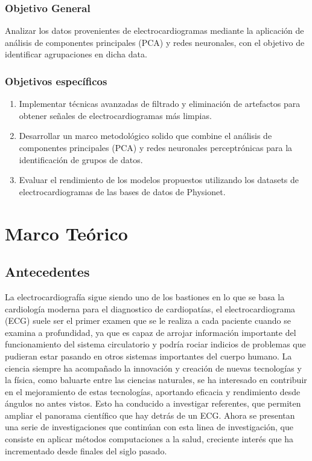 \documentclass[12pt,letterpaper,oneside,openright]{book}
\begin{document}
	\subsection{Objetivo General}
		Analizar los datos provenientes de electrocardiogramas mediante la aplicación de análisis de componentes principales (PCA) y redes neuronales, con el objetivo de identificar agrupaciones en dicha data.
	\subsection{Objetivos específicos}
\begin{enumerate}
	\item Implementar técnicas avanzadas de filtrado y eliminación de artefactos para obtener señales de electrocardiogramas más limpias.
	\item Desarrollar un marco metodológico solido que combine el análisis de componentes principales (PCA) y redes neuronales perceptrónicas para la identificación de grupos de datos.
	\item Evaluar el rendimiento de los modelos propuestos utilizando los datasets de electrocardiogramas de las bases de datos de Physionet.
\end{enumerate}



\chapter{Marco Teórico}

\section{Antecedentes}
	
La electrocardiografía sigue siendo uno de los bastiones en lo que se basa la cardiología moderna para el diagnostico de cardiopatías, el electrocardiograma (ECG) suele ser el primer examen que se le realiza a cada paciente cuando se examina a profundidad, ya que es capaz de arrojar información importante del funcionamiento del sistema circulatorio y podría rociar indicios de problemas que pudieran estar pasando en otros sistemas importantes del cuerpo humano. La ciencia siempre ha acompañado la innovación y creación de nuevas tecnologías y la física, como baluarte entre las ciencias naturales, se ha interesado en contribuir en el mejoramiento de estas tecnologías, aportando eficacia y rendimiento desde ángulos no antes vistos. Esto ha conducido a investigar referentes, que permiten ampliar el panorama científico que hay detrás de un ECG. 
Ahora se presentan una serie de investigaciones que continúan con esta linea de investigación, que consiste en aplicar métodos computaciones a la salud, creciente interés que ha incrementado desde finales del siglo pasado. \\
	
\end{document}
